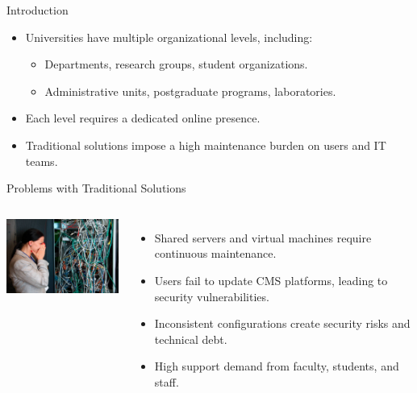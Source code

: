 \begin{frame}{Introduction}
    \begin{itemize}
        \item Universities have multiple organizational levels, including:
        \begin{itemize}
            \item Departments, research groups, student organizations.
            \item Administrative units, postgraduate programs, laboratories.
        \end{itemize}
        \item Each level requires a dedicated online presence.
        \item Traditional solutions impose a high maintenance burden on users and IT teams.
    \end{itemize}
\end{frame}

\begin{frame}{Problems with Traditional Solutions}

    \begin{columns}
            \includegraphics[width=5cm]{../../images/rack.jpg}
            \begin{itemize}
                \item Shared servers and virtual machines require continuous maintenance.
                \item Users fail to update CMS platforms, leading to security vulnerabilities.
                \item Inconsistent configurations create security risks and technical debt.
                \item High support demand from faculty, students, and staff.
            \end{itemize}
    \end{columns}
\end{frame}

